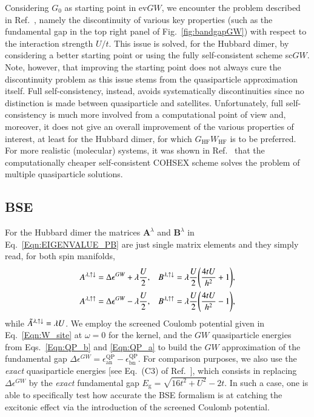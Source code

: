 \documentclass[aps,prb,reprint,superscriptaddress]{revtex4-1}
\newcommand{\IS}{\lambda}
\newcommand{\singlet}{\uparrow\downarrow}
\newcommand{\triplet}{\uparrow\uparrow}
\newcommand{\eps}{\epsilon}
\newcommand{\Eg}{E_\text{g}}
\newcommand{\A}[2]{A_{#1}^{#2}}
\newcommand{\tA}[2]{\Tilde{A}_{#1}^{#2}}
\newcommand{\B}[2]{B_{#1}^{#2}}
\newcommand{\bA}[1]{\boldsymbol{A}^{#1}}
\newcommand{\bB}[1]{\boldsymbol{B}^{#1}}
\newcommand{\bn}{\text{bn}}
\newcommand{\an}{\text{an}}
\begin{document}
Considering $G_0$ as starting point in ev$GW$, we encounter the problem described in Ref.~\citep{Veril_2018}, namely the discontinuity of various key properties (such as the fundamental gap in the top right panel of Fig.~\ref{fig:bandgapGW}) with respect to the interaction strength $U/t$. 
This issue is solved, for the Hubbard dimer, by considering a better starting point or using the fully self-consistent scheme sc$GW$.
Note, however, that improving the starting point does not always cure the discontinuity problem as this issue stems from the quasiparticle approximation itself.
Full self-consistency, instead, avoids systematically discontinuities since no distinction is made between quasiparticle and satellites. Unfortunately, full self-consistency is much more involved from a computational point of view and, moreover, it does not give an overall improvement of the various properties of interest, at least for the Hubbard dimer, for which $G_{\text{HF}}W_{\text{HF}}$ is to be preferred. For more realistic (molecular) systems, it was shown in Ref.~\citep{Berger_2021} that the computationally cheaper self-consistent COHSEX scheme solves the problem of multiple quasiparticle solutions.

\subsection{BSE}
For the Hubbard dimer the matrices $\bA{\IS}$ and $\bB{\IS}$ in Eq.~\ref{Eqn:EIGENVALUE_PB} are just single matrix elements and they simply read, for both spin manifolds,
\begin{subequations}
\begin{align}
	\label{Eqn:AB_S}
	\A{}{\IS,\singlet} & =\Delta\eps^{GW}+ \IS \frac{U}{2},
	&
	\B{}{\IS,\singlet} & =  \IS \frac{U}{2} \qty(\frac{4 t U}{h^2} + 1 ),
	\\
	\label{Eqn:AB_T}
	\A{}{\IS,\triplet} & =\Delta\eps^{GW}- \IS \frac{U}{2},
	&
	\B{}{\IS,\triplet} & =  \IS \frac{U}{2} \qty(\frac{4 t U}{h^2} - 1 ),
\end{align}
\end{subequations}
while $\tA{}{\IS,\singlet} = \IS U$. We employ the screened Coulomb potential given in Eq.~\eqref{Eqn:W_site} at $\omega=0$ for the kernel,
and the $GW$ quasiparticle energies from Eqs.~\eqref{Eqn:QP_b} and \eqref{Eqn:QP_a} to build the $GW$ approximation of the fundamental gap $\Delta\eps^{GW} = \eps^{\text{QP}}_{\an}-\eps^{\text{QP}}_{\bn}$.
For comparison purposes, we also use the \textit{exact} quasiparticle energies [see Eq.~(C3) of Ref.~\citep{Romaniello_2012}], which consists in replacing $\Delta\eps^{GW}$ by the \textit{exact} fundamental gap $\Eg = \sqrt{16t^2+U^2}-2t$. 
In such a case, one is able to specifically test how accurate the BSE formalism is at catching the excitonic effect via the introduction of the screened Coulomb potential.
\end{document}
